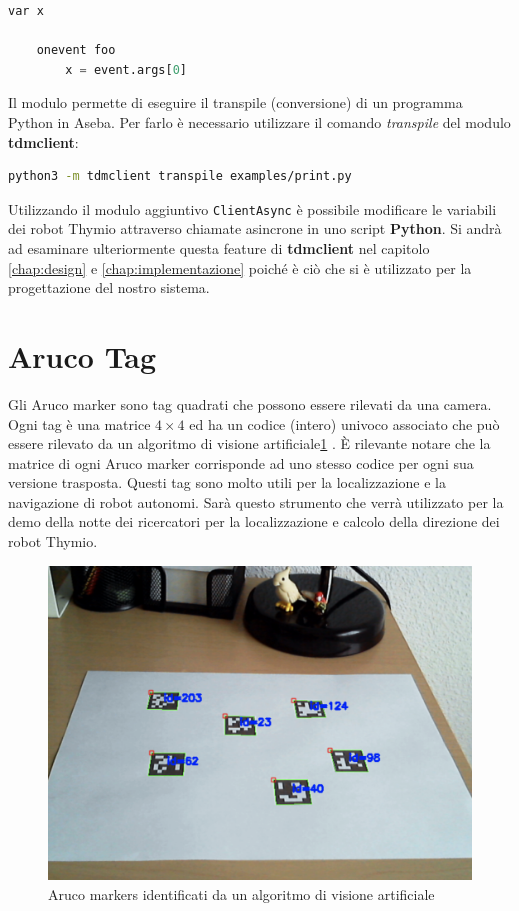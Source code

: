 \documentclass[12pt,a4paper,openright,twoside]{book}
\begin{document}
\begin{lstlisting}[language=Python, label={lst:thymio-catch-event}, caption={Esempio di programma interno a Thymio per la ricezione di eventi (foo)}]
    var x

    onevent foo
        x = event.args[0]
\end{lstlisting}

Il modulo permette di eseguire il transpile (conversione) di un programma Python in Aseba. Per farlo è necessario utilizzare il comando \textit{transpile} del modulo \textbf{tdmclient}:

\begin{lstlisting}[language=Bash, label={lst:transpile-python-to-aseba}, caption={Esempio di transpile di un programma Python (print.py) in Aseba}]
    python3 -m tdmclient transpile examples/print.py
\end{lstlisting}

Utilizzando il modulo aggiuntivo \verb|ClientAsync| è possibile modificare le variabili dei robot Thymio attraverso chiamate asincrone in uno script \textbf{Python}.
Si andrà ad esaminare ulteriormente questa feature di \textbf{tdmclient} nel capitolo \cref{chap:design} e \cref{chap:implementazione} poiché è ciò che si è utilizzato per la progettazione del nostro sistema.

\section{Aruco Tag}

Gli Aruco marker sono tag quadrati che possono essere rilevati da una camera. Ogni tag è una matrice $4 \times 4$ ed ha un codice (intero) univoco associato che può essere rilevato da un algoritmo di visione artificiale\cref{fig:aruco-markers} \cite{opencvOpenCVDetection}. È rilevante notare che la matrice di ogni Aruco marker corrisponde ad uno stesso codice per ogni sua versione trasposta. 
Questi tag sono molto utili per la localizzazione e la navigazione di robot autonomi. Sarà questo strumento che verrà utilizzato per la demo della notte dei ricercatori per la localizzazione e calcolo della direzione dei robot Thymio.

\begin{figure}
    \centering
    \includegraphics[width=.8\linewidth]{figures/aruco-markers.png}
    \caption{Aruco markers identificati da un algoritmo di visione artificiale}
    \label{fig:aruco-markers}
\end{figure}
\end{document}
